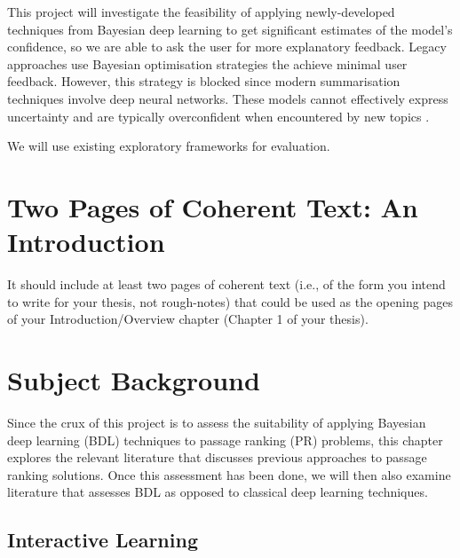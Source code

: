\documentclass[ %
                    author={James Stephenson},
                supervisor={Dr. Edwin Simpson},
                    degree={MSc},
                     title={Project Plan: Bayesian Deep Learning For Extractive Test Summarisation},
                  subtitle={},
                      type={},
                      year={2022}]{../additions/dissertation}
\begin{document}
		This project will investigate the feasibility of applying newly-developed techniques from Bayesian deep learning \cite{Wilson20} to get significant estimates of the model's confidence, so we are able to ask the user for more explanatory feedback. Legacy approaches use Bayesian optimisation \cite{Simpson19} strategies the achieve minimal user feedback. However, this strategy is blocked since modern summarisation techniques involve deep neural networks. These models cannot effectively express uncertainty and are typically overconfident when encountered by new topics \cite{Xu19}. 
		
		We will use existing exploratory frameworks \cite{Simpson19} for evaluation. 
	
	\mainmatter
	
	 
	\chapter{Two Pages of Coherent Text: An Introduction}
	\label{chap:introduction}
		
		It should include at least two pages of coherent text (i.e., of the form you intend to write for your thesis, not rough-notes) that could be used as the opening pages of your Introduction/Overview chapter (Chapter 1 of your thesis). 
		
	
	\chapter{Subject Background}
	\label{chap:literaturereview}
		
	Since the crux of this project is to assess the suitability of applying Bayesian deep learning (BDL) techniques to passage ranking (PR) problems, this chapter explores the relevant literature that discusses previous approaches to passage ranking solutions. Once this assessment has been done, we will then also examine literature that assesses BDL as opposed to classical deep learning techniques.
		
		\section{Interactive Learning}
		\label{chap:literaturereview:interactive}
		
\end{document}
